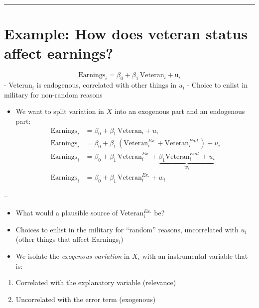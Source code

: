 \documentclass[
]{article}
\providecommand{\tightlist}{%
  \setlength{\itemsep}{0pt}\setlength{\parskip}{0pt}}
\begin{document}
\begin{center}\rule{0.5\linewidth}{0.5pt}\end{center}

\hypertarget{example-how-does-veteran-status-affect-earnings}{%
\section{Example: How does veteran status affect
earnings?}\label{example-how-does-veteran-status-affect-earnings}}

\[
\text{Earnings}_{i}
    = \beta_0+\beta_1 \, \text{Veteran}_{i}
    + \text{u}_{i}
\] - Veteran\(_i\) is endogenous, correlated with other things in
\(u_i\) - Choice to enlist in military for non-random reasons

\begin{itemize}
\tightlist
\item
  We want to split variation in \(X\) into an exogenous part and an
  endogenous part: \[
  \begin{align*}
  \text{Earnings}_i &= \beta_0 + \beta_1 \, \text{Veteran}_i + u_i \\
  \text{Earnings}_i &= \beta_0 + \beta_1 \,  (\text{Veteran}_i^{Ex.}+\text{Veteran}_i^{End.})+u_i\\
  \text{Earnings}_i &= \beta_0 + \beta_1 \, \text{Veteran}_i^{Ex.} + \underbrace{\beta_1 \text{Veteran}_i^{End.}+u_i}_{w_i}\\
  \text{Earnings}_i &= \beta_0 + \beta_1 \, \text{Veteran}_i^{Ex.} + w_i
  \end{align*}
  \]
\end{itemize}

--

\begin{itemize}
\item
  What would a plausible source of Veteran\(_i^{Ex.}\) be?
\item
  Choices to enlist in the military for ``random'' reasons, uncorrelated
  with \(u_i\) (other things that affect Earnings\(_i)\)
\item
  We isolate the \emph{exogenous variation} in \(X_i\) with an
  instrumental variable that is:
\end{itemize}

\begin{enumerate}
\def\labelenumi{\arabic{enumi}.}
\tightlist
\item
  Correlated with the explanatory variable (relevance)
\item
  Uncorrelated with the error term (exogenous)
\end{enumerate}
\end{document}
